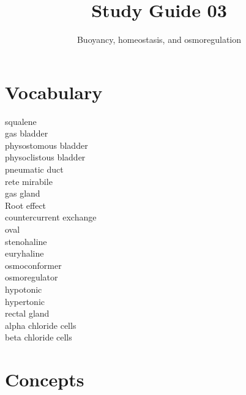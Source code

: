 \documentclass[nofonts, letterpaper]{tufte-handout}
\title{Study Guide 03}
\author{Buoyancy, homeostasis, and osmoregulation}
\date{} %
\begin{document}
\maketitle	%


\section{Vocabulary} 
\vspace{-1\baselineskip}
\begin{multicols}{2}
squalene \\
gas bladder \\
physostomous bladder \\
physoclistous bladder \\
pneumatic duct \\
rete mirabile \\
gas gland \\
Root effect \\
countercurrent exchange \\
oval \\
stenohaline \\
euryhaline \\
osmoconformer \\
osmoregulator \\
hypotonic \\
hypertonic \\
rectal gland \\
alpha chloride cells \\
beta chloride cells
\end{multicols}

\section{Concepts}
\end{document}
